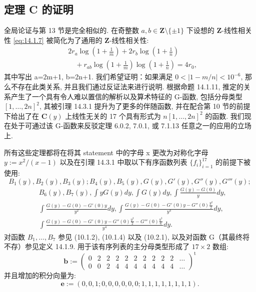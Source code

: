 \subsection{定理 C 的证明}\label{sec:14.5}

全局论证与第 13 节是完全相似的. 
在奇整数 \(a, b \in \mathbf{Z} \setminus \{\pm 1\}\) 下设想的 \(\mathbf{Z}\)-线性相关性 \eqref{eq:14.1.7} 
被简化为了通用的 \(\mathbf{Z}\)-线性相关性:
\[
\begin{aligned}
&2r_a \log\left(1 + \frac{1}{m}\right) + 2r_b \log\left(1 + \frac{1}{n}\right) \\
&\quad + r_{ab} \log\left(1 + \frac{1}{m}\right) \log\left(1 + \frac{1}{n}\right) = 4r_0,
\end{aligned}
\]
其中写出 a=2m+1, b=2n+1. 我们希望证明：如果满足 \(0<|1-m/n|<10^{-6}\), 
那么不存在此类关系, 并且我们通过反证法来进行说明. 
根据命题 14.1.11, 推定的关系产生了一个具有令人难以置信的解析以及算术特征的 G-函数, 
包括分母类型 \([1,\dots,2n]^2\), 
其被引理 14.3.1 提升为了更多的伴随函数, 
并在配合第 10 节的前提下给出了在 \(\mathbf{C}(y)\) 上线性无关的 17 个具有形式为 \(n[1,\ldots,2n]^2\) 
的函数. 
我们现在处于可通过该 G-函数来反驳定理 6.0.2, 7.0.1, 或 7.1.13 任意之一的应用的立场上.

所有这些定理都将在将其 statement 中的字母 x 更改为对称化字母 \(y := x^2/(x-1)\) 以及在引理 14.3.1 中取以下有序函数列表 \(\{f_i\}_{i=1}^{17}\) 
的前提下被使用:
\[ B_{1}(y), B_{2}(y), B_{3}(y); B_{4}(y), B_{5}(y), G(y), G'(y), G''(y), G'''(y); \]
\[
\begin{aligned}
&B_{6}(y), B_{7}(y), \int yG(y) dy, \int G(y) dy, \int \frac{G(y) - G(0)}{y} dy, \\
&\int \frac{G(y) - G(0) - G'(0)y}{y^{2}} dy, \int \frac{G(y) - G(0) - G'(0)y - G''(0)\frac{y^{2}}{2}}{y^{3}} dy, \\
&\int \frac{G(y) - G(0) - G'(0)y - G''(0)\frac{y^{2}}{2} - G'''(0)\frac{y^{3}}{6}}{y^{4}} dy.
\end{aligned}
\]
对函数 \(B_1, \ldots, B_7\) 参见 (10.1.2), (10.1.4) 以及 (10.2.1), 
以及对函数 G（其最终将不存）参见定义 14.1.9. 
用于该有序列表的主分母类型形成了 \(17 \times 2\) 数组:
\[ \mathbf{b} := \begin{pmatrix} 
0 & 2 & 2 & 2 & 2 & 2 & 2 & 2 & 2 & 2 & \dots \\ 
0 & 0 & 2 & 4 & 4 & 4 & 4 & 4 & 4 & 4 & \dots
\end{pmatrix}^{\mathrm{t}} \]
并且增加的积分向量为:
\[ \mathbf{e} := (0, 0, 1; 0, 0, 0, 0, 0, 0; 1, 1, 1, 1, 1, 1, 1, 1). \]

